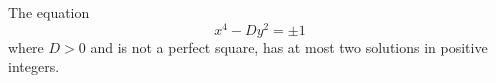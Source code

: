 \begin{proposition}\label{eq:130}
    The equation
\[
    x^4-Dy^2=\pm1
\]
    where $D>0$ and is not a perfect square, has at most two solutions in positive integers.
\end{proposition}
